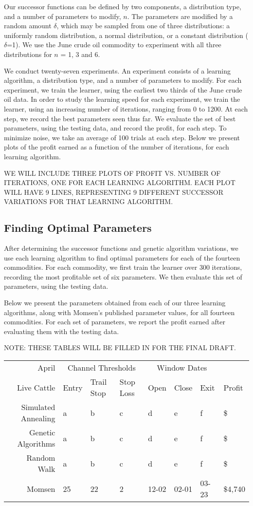 \documentclass[12pt]{article}
\begin{document}
Our successor functions can be defined by two components, a distribution type,
and a number of parameters to modify, $n$. The parameters are modified by a
random amount $\delta$, which may be sampled from one of three distributions: a
uniformly random distribution, a normal distribution, or a constant distribution
($\delta$=1). We use the June crude oil commodity to experiment with all three
distributions for $n$ = 1, 3 and 6.

We conduct twenty-seven experiments. An experiment consists of a learning
algorithm, a distribution type, and a number of parameters to modify. For each
experiment, we train the learner, using the earliest two thirds of the June
crude oil data. In order to study the learning speed for each experiment, we
train the learner, using an increasing number of iterations, ranging from 0 to
1200.  At each step, we record the best parameters seen thus far.  We evaluate
the set of best parameters, using the testing data, and record the profit, for
each step. To minimize noise, we take an average of 100 trials at each
step. Below we present plots of the profit earned as a function of the number of
iterations, for each learning algorithm.


WE WILL INCLUDE THREE PLOTS OF PROFIT VS. NUMBER OF ITERATIONS, ONE FOR EACH
LEARNING ALGORITHM. EACH PLOT WILL HAVE 9 LINES, REPRESENTING 9 DIFFERENT
SUCCESSOR VARIATIONS FOR THAT LEARNING ALGORITHM.

\subsection{Finding Optimal Parameters}

After determining the successor functions and genetic algorithm variations, we
use each learning algorithm to find optimal parameters for each of the fourteen
commodities. For each commodity, we first train the learner over 300 iterations,
recording the most profitable set of six parameters. We then evaluate this set
of parameters, using the testing data.

Below we present the parameters obtained from each of our three learning
algorithms, along with Momsen's published parameter values, for all fourteen
commodities. For each set of parameters, we report the profit earned after
evaluating them with the testing data.


NOTE: THESE TABLES WILL BE FILLED IN FOR THE FINAL DRAFT.

\begin{tabular}{|r|l|l|l|l|l|l|l|}
  \hline
  April & \multicolumn{3}{|c|}{Channel Thresholds} & \multicolumn{3}{|c|}{Window Dates} &  \\
  Live Cattle & Entry & Trail Stop & Stop Loss & Open & Close & Exit & Profit\\ \hline
  Simulated Annealing & a & b & c & d & e & f & \$ \\ \hline
  Genetic Algorithms & a & b & c & d & e & f & \$ \\ \hline
  Random Walk & a & b & c & d & e & f & \$ \\ \hline
  Momsen & 25 & 22 & 2 & 12-02 & 02-01 & 03-23 & \$4,740 \\ \hline
\end{tabular}
\end{document}
